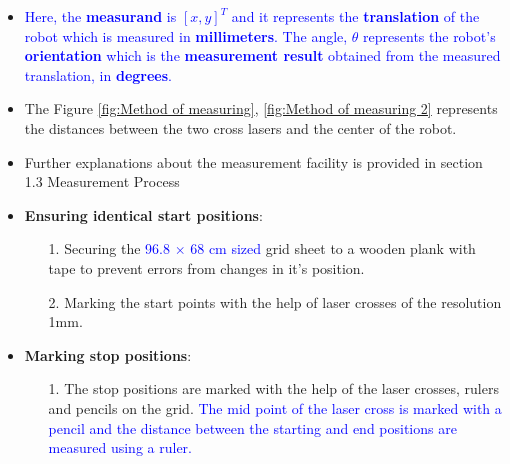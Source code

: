 {\begin{itemize}
        \item \textcolor{blue}{Here, the \textbf{measurand} is $[x, y]^T$ and it represents the \textbf{translation} of the robot which is measured in \textbf{millimeters}. The angle, $\theta$ represents the robot's \textbf{orientation} which is the \textbf{measurement result} obtained from the measured translation, in \textbf{degrees}.}

        \item The Figure \ref{fig:Method of measuring}, \ref{fig:Method of measuring 2} represents the distances between the two cross lasers and the center of the robot. 

        
        
        \item Further explanations about the measurement facility is provided in section 1.3 Measurement Process
        
        \item \textbf{Ensuring identical start positions}:
        \begin{itemize}
            \item[1.] Securing the \textcolor{blue}{96.8 $\times$ 68 cm sized} grid sheet to a wooden plank with tape to prevent errors from changes in it's position. %
            \item[2.] Marking the start points with the help of laser crosses of the resolution 1mm.
        \end{itemize}
        
        \item \textbf{{Marking stop positions}}:
        \begin{itemize}
            \item[1.] The stop positions are marked with the help of the laser crosses, rulers and pencils on the grid. \textcolor{blue}{The mid point of the laser cross is marked with a pencil and the distance between the starting and end positions are measured using  a ruler.}
        \end{itemize}
    \end{itemize}
    
    }
    
